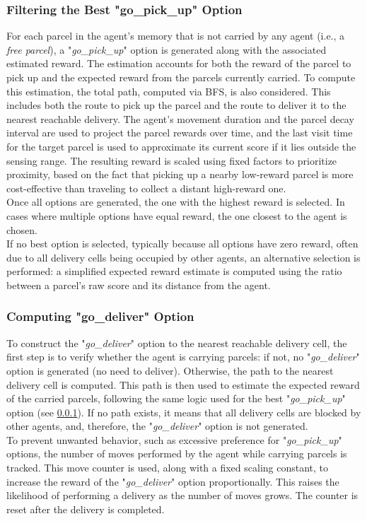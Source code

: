         \subsubsection{Filtering the Best "go\_pick\_up" Option}\label{best_pickup}
            For each parcel in the agent's memory that is not carried by any agent (i.e., a \textit{free parcel}), a "\textit{go\_pick\_up}" option is generated along with the associated estimated reward. The estimation accounts for both the reward of the parcel to pick up and the expected reward from the parcels currently carried. To compute this estimation, the total path, computed via BFS, is also considered. This includes both the route to pick up the parcel and the route to deliver it to the nearest reachable delivery. The agent's movement duration and the parcel decay interval are used to project the parcel rewards over time, and the last visit time for the target parcel is used to approximate its current score if it lies outside the sensing range. The resulting reward is scaled using fixed factors to prioritize proximity, based on the fact that picking up a nearby low-reward parcel is more cost-effective than traveling to collect a distant high-reward one.
            \medskip\\
            Once all options are generated, the one with the highest reward is selected. In cases where multiple options have equal reward, the one closest to the agent is chosen.
            \medskip\\
            If no best option is selected, typically because all options have zero reward, often due to all delivery cells being occupied by other agents, an alternative selection is performed: a simplified expected reward estimate is computed using the ratio between a parcel's raw score and its distance from the agent.

        \subsubsection{Computing "go\_deliver" Option}
            To construct the "\textit{go\_deliver}" option to the nearest reachable delivery cell, the first step is to verify whether the agent is carrying parcels: if not, no "\textit{go\_deliver}" option is generated (no need to deliver). Otherwise, the path to the nearest delivery cell is computed. This path is then used to estimate the expected reward of the carried parcels, following the same logic used for the best "\textit{go\_pick\_up}" option (see \ref{best_pickup}). If no path exists, it means that all delivery cells are blocked by other agents, and, therefore, the "\textit{go\_deliver}" option is not generated.
            \medskip\\
            To prevent unwanted behavior, such as excessive preference for "\textit{go\_pick\_up}" options, the number of moves performed by the agent while carrying parcels is tracked. This move counter is used, along with a fixed scaling constant, to increase the reward of the "\textit{go\_deliver}" option proportionally. This raises the likelihood of performing a delivery as the number of moves grows. The counter is reset after the delivery is completed.

